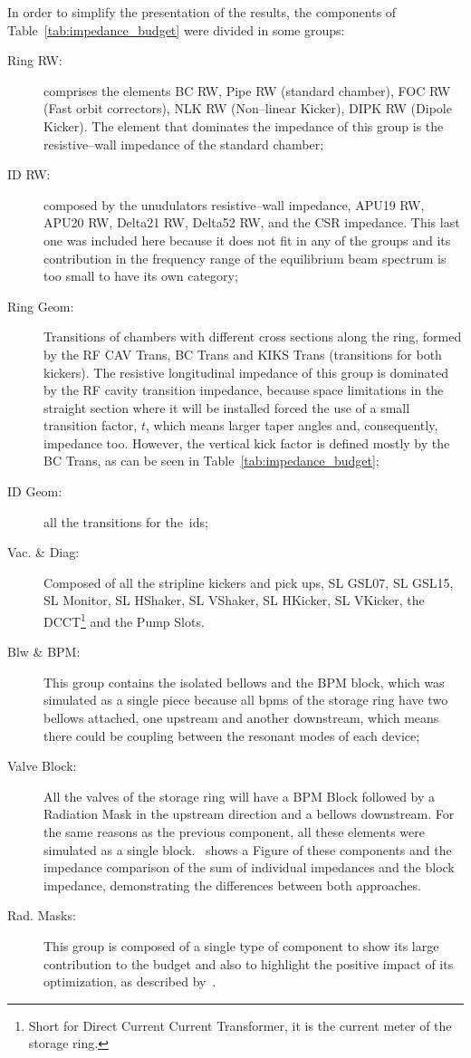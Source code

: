     In order to simplify the presentation of the results, the components of Table~\ref{tab:impedance_budget} were divided in some groups:
    \begin{description}
        \item[Ring RW:] comprises the elements BC RW, Pipe RW (standard chamber), FOC RW (Fast orbit correctors), NLK RW (Non--linear Kicker), DIPK RW (Dipole Kicker). The element that dominates the impedance of this group is the resistive--wall impedance of the standard chamber;
        \item[ID RW:] composed by the unudulators resistive--wall impedance, APU19 RW, APU20 RW, Delta21 RW, Delta52 RW, and the CSR impedance. This last one was included here because it does not fit in any of the groups and its contribution in the frequency range of the equilibrium beam spectrum is too small to have its own category;
        \item[Ring Geom:] Transitions of chambers with different cross sections along the ring, formed by the RF CAV Trans, BC Trans and KIKS Trans (transitions for both kickers). The resistive longitudinal impedance of this group is dominated by the RF cavity transition impedance, because space limitations in the straight section where it will be installed forced the use of a small transition factor, $t$, which means larger taper angles and, consequently, impedance too. However, the vertical kick factor is defined mostly by the BC Trans, as can be seen in Table~\ref{tab:impedance_budget};
        \item[ID Geom:] all the transitions for the~\glspl{id};
        \item[Vac. \& Diag:] Composed of all the stripline kickers and pick ups, SL GSL07, SL GSL15, SL Monitor, SL HShaker, SL VShaker, SL HKicker, SL VKicker, the DCCT\footnote{Short for Direct Current Current Transformer, it is the current meter of the storage ring.} and the Pump Slots.
        \item[Blw \& BPM:] This group contains the isolated bellows and the BPM block,
        which was simulated as a single piece because all \glspl{bpm} of the storage ring have two bellows attached, one upstream and another downstream, which means there could be coupling between the resonant modes of each device;
        \item[Valve Block:] All the valves of the storage ring will have a BPM Block followed by a Radiation Mask in the upstream direction and a bellows downstream. For the same reasons as the previous component, all these elements were simulated as a single block.~ shows a Figure of these components and the impedance comparison of the sum of individual impedances and the block impedance, demonstrating the differences between both approaches.
        \item[Rad. Masks:] This group is composed of a single type of component to show its large contribution to the budget and also to highlight the positive impact of its optimization, as described by~.
    \end{description}


